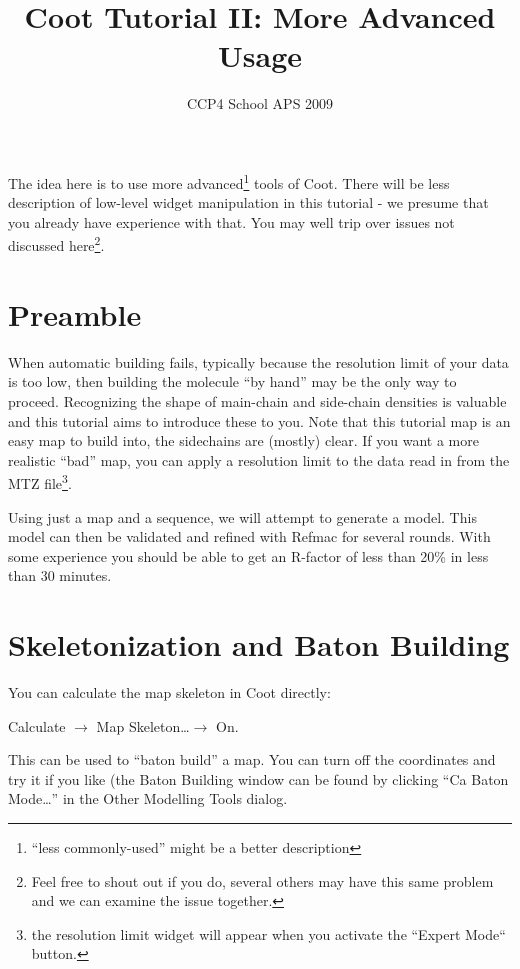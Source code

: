 \documentclass{article}
\title{Coot Tutorial II: More Advanced Usage}
\author{CCP4 School APS 2009}
\begin{document}
\maketitle


   


The idea here is to use more advanced\footnote{``less commonly-used''
  might be a better description} tools of Coot.  There will be less
description of low-level widget manipulation in this tutorial - we
presume that you already have experience with that.  You may well trip
over issues not discussed here\footnote{Feel free to shout out if you
  do, several others may have this same problem and we can examine the
  issue together.}.

\section{Preamble}

When automatic building fails, typically because the resolution limit
of your data is too low, then building the molecule ``by hand'' may be
the only way to proceed.  Recognizing the shape of main-chain and
side-chain densities is valuable and this tutorial aims to introduce
these to you.  Note that this tutorial map is an easy map to build
into, the sidechains are (mostly) clear.  If you want a more realistic
``bad'' map, you can apply a resolution limit to the data read in from
the MTZ file\footnote{the resolution limit widget will appear when you
  activate the ``Expert Mode`` button.}.

Using just a map and a sequence, we will attempt to generate a model.
This model can then be validated and refined with Refmac for several
rounds.  With some experience you should be able to get an R-factor of
less than 20\% in less than 30 minutes.

\section{Skeletonization and Baton Building}


You can calculate the map skeleton in Coot directly:

\textsf{Calculate $\rightarrow$ Map Skeleton\ldots $\rightarrow$ On.}

This can be used to ``baton build'' a map.  You can turn off the
coordinates and try it if you like (the Baton Building window can be
found by clicking \textsf{``Ca Baton Mode\ldots''} in the Other
Modelling Tools dialog.
  
\end{document}
